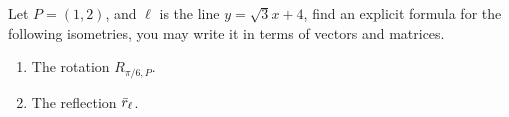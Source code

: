 \documentclass{subfiles}
\begin{document}
Let $P=(1,2)$, and $\ell$ is the line $y=\sqrt{3}x+4$, find an explicit formula for the following isometries, you may write it in terms of vectors and matrices.
\begin{enumerate}
	\item The rotation $R_{\pi/6, P}$.
	\item The reflection $\bar{r}_{\ell}$.
\end{enumerate}
\end{document}
